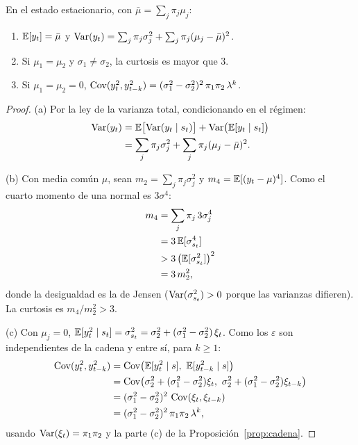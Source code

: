 \begin{proposicion}\label{prop:mezcla}
En el estado estacionario, con $\bar\mu=\sum_j\pi_j\mu_j$:
\begin{enumerate}[label=(\alph*)]
  \item $\mathbb{E}[y_t]=\bar\mu$ y $\operatorname{Var}(y_t)=\sum_j\pi_j\sigma_j^2+\sum_j\pi_j(\mu_j-\bar\mu)^2$.
  \item Si $\mu_1=\mu_2$ y $\sigma_1\neq\sigma_2$, la curtosis es mayor que 3.
  \item Si $\mu_1=\mu_2=0$, $\operatorname{Cov}(y_t^2,y_{t-k}^2)=(\sigma_1^2-\sigma_2^2)^2\,\pi_1\pi_2\,\lambda^k$.
\end{enumerate}
\end{proposicion}

\begin{proof}
(a) Por la ley de la varianza total, condicionando en el régimen:
\begin{align*}
  \operatorname{Var}(y_t) &= \mathbb{E}\bigl[\operatorname{Var}(y_t\mid s_t)\bigr]+\operatorname{Var}\bigl(\mathbb{E}[y_t\mid s_t]\bigr)\\
            &= \sum_j\pi_j\sigma_j^2+\sum_j\pi_j(\mu_j-\bar\mu)^2 .
\end{align*}

(b) Con media común $\mu$, sean $m_2=\sum_j\pi_j\sigma_j^2$ y $m_4=\mathbb{E}[(y_t-\mu)^4]$. Como el cuarto momento de una normal es
$3\sigma^4$:
\begin{align*}
  m_4 &= \sum_j\pi_j\,3\sigma_j^4\\
      &= 3\,\mathbb{E}[\sigma_{s_t}^4]\\
      &> 3\,\bigl(\mathbb{E}[\sigma_{s_t}^2]\bigr)^2\\
      &= 3\,m_2^2,
\end{align*}
donde la desigualdad es la de Jensen ($\operatorname{Var}(\sigma^2_{s_t})>0$ porque las varianzas difieren). La curtosis es
$m_4/m_2^2>3$.

(c) Con $\mu_j=0$, $\mathbb{E}[y_t^2\mid s_t]=\sigma_{s_t}^2=\sigma_2^2+(\sigma_1^2-\sigma_2^2)\,\xi_t$. Como los $\varepsilon$ son independientes
de la cadena y entre sí, para $k\ge1$:
\begin{align*}
  \Cov(y_t^2,y_{t-k}^2) &= \Cov\bigl(\E[y_t^2\mid s],\ \E[y_{t-k}^2\mid s]\bigr)\\
                        &= \Cov\bigl(\sigma_2^2+(\sigma_1^2-\sigma_2^2)\xi_t,\ \sigma_2^2+(\sigma_1^2-\sigma_2^2)\xi_{t-k}\bigr)\\
                        &= (\sigma_1^2-\sigma_2^2)^2\,\Cov(\xi_t,\xi_{t-k})\\
                        &= (\sigma_1^2-\sigma_2^2)^2\,\pi_1\pi_2\,\lambda^k,
\end{align*}
usando $\operatorname{Var}(\xi_t)=\pi_1\pi_2$ y la parte (c) de la Proposición~\ref{prop:cadena}.
\end{proof}

